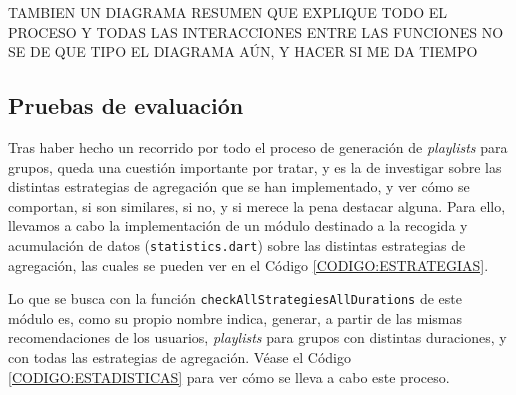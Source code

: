 
TAMBIEN UN DIAGRAMA RESUMEN QUE EXPLIQUE TODO EL PROCESO Y TODAS LAS INTERACCIONES ENTRE LAS FUNCIONES 
NO SE DE QUE TIPO EL DIAGRAMA AÚN, Y HACER SI ME DA TIEMPO


\subsection{Pruebas de evaluación\label{SEC:PRUEBAS_EVALUACION_IMPLEMENTACION}}

Tras haber hecho un recorrido por todo el proceso de generación de \textit{playlists} para grupos, queda una cuestión importante por tratar, y es
la de investigar sobre las distintas estrategias de agregación que se han implementado, y ver cómo se comportan, si son similares, si no, y si merece la pena 
destacar alguna. Para ello, llevamos a cabo la implementación de un módulo destinado a la recogida y acumulación de datos (\texttt{statistics.dart}) sobre 
las distintas estrategias de agregación, las cuales se pueden ver en el Código \ref{CODIGO:ESTRATEGIAS}.

Lo que se busca con la función \texttt{checkAllStrategiesAllDurations}  de este módulo es, como su propio nombre indica, generar, a partir de las 
mismas recomendaciones de los usuarios, \textit{playlists} para grupos con distintas duraciones, y con todas las estrategias de agregación.
Véase el Código \ref{CODIGO:ESTADISTICAS} para ver cómo se lleva a cabo este proceso.

